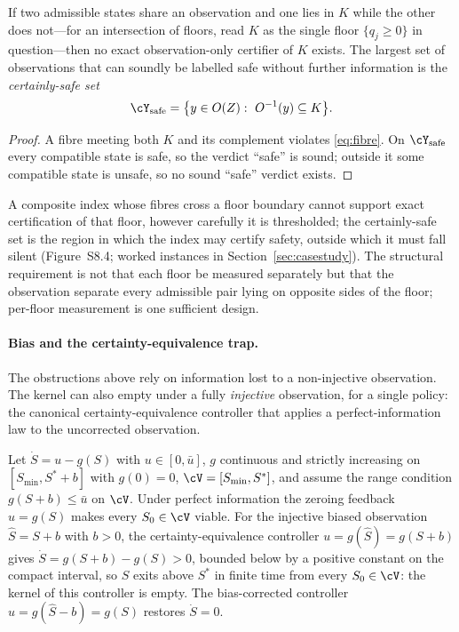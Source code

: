 \begin{corollary}\label{cor:certainly-safe}
If two admissible states share an observation and one lies in $K$ while the other does not---for an intersection of floors, read $K$ as the single floor $\{q_j\ge0\}$ in question---then no exact observation-only certifier of $K$ exists. The largest set of observations that can soundly be labelled safe without further information is the \emph{certainly-safe set}
\[
\cY_{\mathrm{safe}}=\bigl\{y\in O(Z):\ O^{-1}(y)\subseteq K\bigr\}.
\]
\end{corollary}

\begin{proof}
A fibre meeting both $K$ and its complement violates \eqref{eq:fibre}. On $\cY_{\mathrm{safe}}$ every compatible state is safe, so the verdict ``safe'' is sound; outside it some compatible state is unsafe, so no sound ``safe'' verdict exists.
\end{proof}

A composite index whose fibres cross a floor boundary cannot support exact certification of that floor, however carefully it is thresholded; the certainly-safe set is the region in which the index may certify safety, outside which it must fall silent (Figure~S8.4; worked instances in Section~\ref{sec:casestudy}). The structural requirement is not that each floor be measured separately but that the observation separate every admissible pair lying on opposite sides of the floor; per-floor measurement is one sufficient design.

\paragraph{Bias and the certainty-equivalence trap.} The obstructions above rely on information lost to a non-injective observation. The kernel can also empty under a fully \emph{injective} observation, for a single policy: the canonical certainty-equivalence controller that applies a perfect-information law to the uncorrected observation.

\begin{proposition}\label{prop:ce-trap}
Let $\dot S=u-g(S)$ with $u\in[0,\bar u]$, $g$ continuous and strictly increasing on $[S_{\min},S^*+b]$ with $g(0)=0$, $\cV=[S_{\min},S^*]$, and assume the range condition $g(S+b)\le\bar u$ on $\cV$. Under perfect information the zeroing feedback $u=g(S)$ makes every $S_0\in\cV$ viable. For the injective biased observation $\hat S=S+b$ with $b>0$, the certainty-equivalence controller $u=g(\hat S)=g(S+b)$ gives $\dot S=g(S+b)-g(S)>0$, bounded below by a positive constant on the compact interval, so $S$ exits above $S^*$ in finite time from every $S_0\in\cV$: the kernel of this controller is empty. The bias-corrected controller $u=g(\hat S-b)=g(S)$ restores $\dot S=0$.
\end{proposition}

